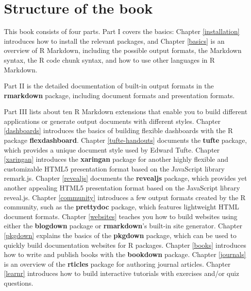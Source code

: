 \documentclass[
  11pt,
]{krantz}
\theoremstyle{definition}
\theoremstyle{definition}
\theoremstyle{definition}
\theoremstyle{definition}
\theoremstyle{remark}
\begin{document}
\hypertarget{structure-of-the-book}{%
\section*{Structure of the book}\label{structure-of-the-book}}


This book consists of four parts. Part I covers the basics: Chapter \ref{installation} introduces how to install the relevant packages, and Chapter \ref{basics} is an overview of R Markdown, including the possible output formats, the Markdown syntax, the R code chunk syntax, and how to use other languages in R Markdown.

Part II is the detailed documentation of built-in output formats in the \textbf{rmarkdown} package, including document formats and presentation formats.

Part III lists about ten R Markdown extensions that enable you to build different applications or generate output documents with different styles. Chapter \ref{dashboards} introduces the basics of building flexible dashboards with the R package \textbf{flexdashboard}. Chapter \ref{tufte-handouts} documents the \textbf{tufte} package, which provides a unique document style used by Edward Tufte. Chapter \ref{xaringan} introduces the \textbf{xaringan} package for another highly flexible and customizable HTML5 presentation format based on the JavaScript library remark.js. Chapter \ref{revealjs} documents the \textbf{revealjs} package, which provides yet another appealing HTML5 presentation format based on the JavaScript library reveal.js. Chapter \ref{community} introduces a few output formats created by the R community, such as the \textbf{prettydoc} package, which features lightweight HTML document formats. Chapter \ref{websites} teaches you how to build websites using either the \textbf{blogdown} package or \textbf{rmarkdown}'s built-in site generator. Chapter \ref{pkgdown} explains the basics of the \textbf{pkgdown} package, which can be used to quickly build documentation websites for R packages. Chapter \ref{books} introduces how to write and publish books with the \textbf{bookdown} package. Chapter \ref{journals} is an overview of the \textbf{rticles} package for authoring journal articles. Chapter \ref{learnr} introduces how to build interactive tutorials with exercises and/or quiz questions.
\end{document}
